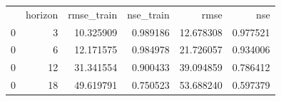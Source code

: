 \begin{tabular}{lrrrrr}
 & horizon & rmse_train & nse_train & rmse & nse \\
0 & 3 & 10.325909 & 0.989186 & 12.678308 & 0.977521 \\
0 & 6 & 12.171575 & 0.984978 & 21.726057 & 0.934006 \\
0 & 12 & 31.341554 & 0.900433 & 39.094859 & 0.786412 \\
0 & 18 & 49.619791 & 0.750523 & 53.688240 & 0.597379 \\
\end{tabular}
